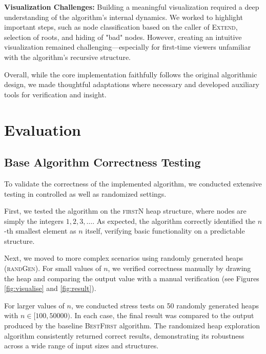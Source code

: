 \documentclass[conference]{IEEEtran}
\begin{document}
\textbf{Visualization Challenges:}  
Building a meaningful visualization required a deep understanding of the algorithm's internal dynamics. We worked to highlight important steps, such as node classification based on the caller of \textsc{Extend}, selection of roots, and hiding of "bad" nodes. However, creating an intuitive visualization remained challenging—especially for first-time viewers unfamiliar with the algorithm’s recursive structure.

Overall, while the core implementation faithfully follows the original algorithmic design, we made thoughtful adaptations where necessary and developed auxiliary tools for verification and insight.

\section{Evaluation}

\subsection{Base Algorithm Correctness Testing}

To validate the correctness of the implemented algorithm, we conducted extensive testing in controlled as well as randomized settings.

First, we tested the algorithm on the \textsc{firstN} heap structure, where nodes are simply the integers $1, 2, 3, \ldots$. As expected, the algorithm correctly identified the $n$-th smallest element as $n$ itself, verifying basic functionality on a predictable structure.

Next, we moved to more complex scenarios using randomly generated heaps (\textsc{randGen}). For small values of $n$, we verified correctness manually by drawing the heap and comparing the output value with a manual verification (see Figures \ref{fig:visualise} and \ref{fig:result}). 

For larger values of $n$, we conducted stress tests on 50 randomly generated heaps with $n \in [100, 50000)$. In each case, the final result was compared to the output produced by the baseline \textsc{BestFirst} algorithm. The randomized heap exploration algorithm consistently returned correct results, demonstrating its robustness across a wide range of input sizes and structures.
\end{document}
